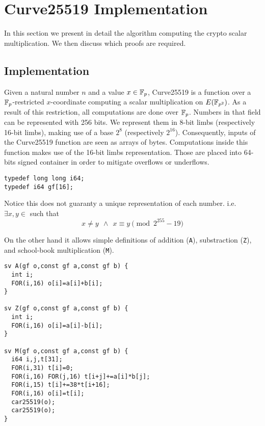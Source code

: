 \section{Curve25519 Implementation}
\label{sec2-implem}

In this section we present in detail the algorithm computing the crypto scalar multiplication.
We then discuss which proofs are required.

\subsection{Implementation} \label{sec:impl}

Given a natural number $n$ and a value $x \in \mathbb{F}_{p}$, Curve25519 is a function over a $\mathbb{F}_{p}$-restricted
$x$-coordinate computing a scalar multiplication on $E(\mathbb{F}_{p^2})$.
As a result of this restriction, all computations are done over $\mathbb{F}_{p}$.
Numbers in that field can be represented with 256 bits.
We represent them in 8-bit limbs (respectively 16-bit limbs),
making use of a base $2^8$ (respectively $2^{16}$).
Consequently, inputs of the Curve25519 function are seen as arrays of bytes.
Computations inside this function makes use of the 16-bit limbs representation.
Those are placed into 64-bits signed container in order to mitigate overflows or underflows.
\begin{lstlisting}[language=Ctweetnacl]
typedef long long i64;
typedef i64 gf[16];
\end{lstlisting}
Notice this does not guaranty a unique representation of each number. i.e.\\
$\exists x,y \in$  such that
\vspace{-0.25cm}
  $$x \neq y\ \ \land\ \ x \equiv y \pmod{2^{255}-19}$$

On the other hand it allows simple definitions of addition (\texttt{A}),
substraction (\texttt{Z}), and school-book multiplication (\texttt{M}).
\begin{lstlisting}[language=Ctweetnacl]
sv A(gf o,const gf a,const gf b) {
  int i;
  FOR(i,16) o[i]=a[i]+b[i];
}

sv Z(gf o,const gf a,const gf b) {
  int i;
  FOR(i,16) o[i]=a[i]-b[i];
}

sv M(gf o,const gf a,const gf b) {
  i64 i,j,t[31];
  FOR(i,31) t[i]=0;
  FOR(i,16) FOR(j,16) t[i+j]+=a[i]*b[j];
  FOR(i,15) t[i]+=38*t[i+16];
  FOR(i,16) o[i]=t[i];
  car25519(o);
  car25519(o);
}
\end{lstlisting}

